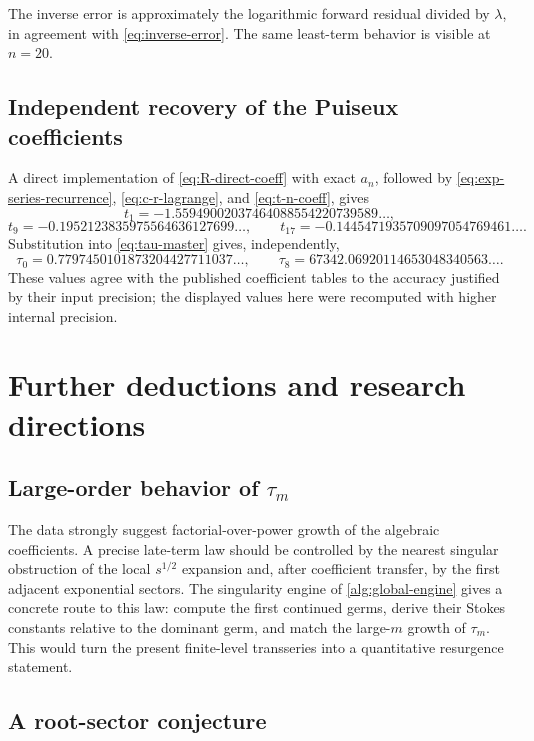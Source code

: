 \documentclass[11pt,oneside]{article}
\numberwithin{equation}{section}
\theoremstyle{plain}
\theoremstyle{definition}
\theoremstyle{remark}
\begin{document}
The inverse error is approximately the logarithmic forward residual divided
by $\lambda$, in agreement with \eqref{eq:inverse-error}.  The same
least-term behavior is visible at $n=20$.

\subsection{Independent recovery of the Puiseux coefficients}

A direct implementation of \eqref{eq:R-direct-coeff} with exact $a_n$,
followed by \eqref{eq:exp-series-recurrence},
\eqref{eq:c-r-lagrange}, and \eqref{eq:t-n-coeff}, gives
\[
 t_1=-1.55949002037464088554220739589\ldots,
\]
\[
 t_9=-0.1952123835975564636127699\ldots,
 \qquad
 t_{17}=-0.1445471935709097054769461\ldots.
\]
Substitution into \eqref{eq:tau-master} gives, independently,
\[
 \tau_0=0.7797450101873204427711037\ldots,
 \qquad
 \tau_8=67342.06920114653048340563\ldots.
\]
These values agree with the published coefficient tables
\cite{Genitrini2016} to the accuracy justified by their input precision;
the displayed values here were recomputed with higher internal precision.

\section{Further deductions and research directions}\label{sec:research}

\subsection{Large-order behavior of $\tau_m$}

The data strongly suggest factorial-over-power growth of the algebraic
coefficients.  A precise late-term law should be controlled by the nearest
singular obstruction of the local $s^{1/2}$ expansion and, after coefficient
transfer, by the first adjacent exponential sectors.  The singularity engine
of \cref{alg:global-engine} gives a concrete route to this law:
compute the first continued germs, derive their Stokes constants relative to
the dominant germ, and match the large-$m$ growth of $\tau_m$.  This would
turn the present finite-level transseries into a quantitative resurgence
statement.

\subsection{A root-sector conjecture}
\end{document}
